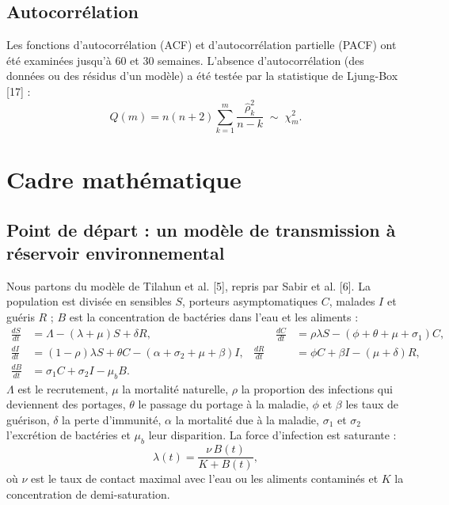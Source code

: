 \documentclass[11pt]{article}
\begin{document}
\subsection{Autocorrélation}
Les fonctions d'autocorrélation (ACF) et d'autocorrélation partielle (PACF) ont été examinées jusqu'à 60 et 30 semaines. L'absence d'autocorrélation (des données ou des résidus d'un modèle) a été testée par la statistique de Ljung-Box [17] :
\begin{equation}
Q(m)=n(n+2)\sum_{k=1}^{m}\frac{\hat{\rho}_k^{2}}{n-k}\;\sim\;\chi^{2}_{m} .
\label{eq:lb}
\end{equation}

\section{Cadre mathématique}
\subsection{Point de départ : un modèle de transmission à réservoir environnemental}
Nous partons du modèle de Tilahun et al. [5], repris par Sabir et al. [6]. La population est divisée en sensibles $S$, porteurs asymptomatiques $C$, malades $I$ et guéris $R$ ; $B$ est la concentration de bactéries dans l'eau et les aliments :
\begin{equation}
\begin{aligned}
\frac{dS}{dt}&=\Lambda-(\lambda+\mu)S+\delta R, &\qquad \frac{dC}{dt}&=\rho\lambda S-(\phi+\theta+\mu+\sigma_1)C,\\
\frac{dI}{dt}&=(1-\rho)\lambda S+\theta C-(\alpha+\sigma_2+\mu+\beta)I, & \frac{dR}{dt}&=\phi C+\beta I-(\mu+\delta)R,\\
\frac{dB}{dt}&=\sigma_1 C+\sigma_2 I-\mu_b B .
\end{aligned}
\label{eq:seir}
\end{equation}
$\Lambda$ est le recrutement, $\mu$ la mortalité naturelle, $\rho$ la proportion des infections qui deviennent des portages, $\theta$ le passage du portage à la maladie, $\phi$ et $\beta$ les taux de guérison, $\delta$ la perte d'immunité, $\alpha$ la mortalité due à la maladie, $\sigma_1$ et $\sigma_2$ l'excrétion de bactéries et $\mu_b$ leur disparition. La force d'infection est saturante :
\begin{equation}
\lambda(t)=\frac{\nu\,B(t)}{K+B(t)} ,
\label{eq:lambda}
\end{equation}
où $\nu$ est le taux de contact maximal avec l'eau ou les aliments contaminés et $K$ la concentration de demi-saturation.
\end{document}
